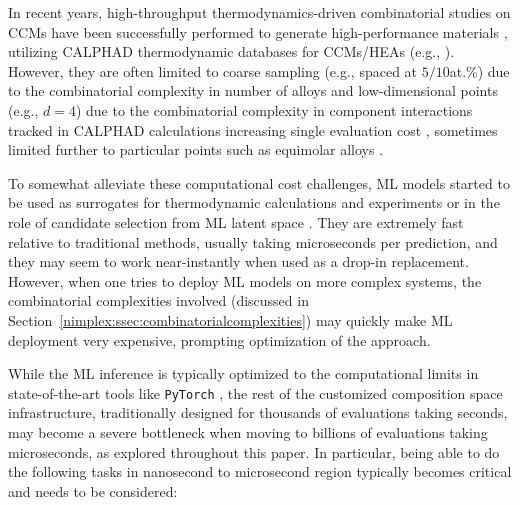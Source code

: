 In recent years, high-throughput thermodynamics-driven combinatorial studies on CCMs have been successfully performed to generate high-performance materials \cite{Elder2023ComputationalValidation, Elder2023ComputationalDown-selection}, utilizing  CALPHAD thermodynamic databases for CCMs/HEAs (e.g., \cite{Ostrowska2020ThermodynamicW, Ostrowska2022ThermodynamicExperiments, GambaroCombinedAlloys}). However, they are often limited to coarse sampling (e.g., spaced at $5/10$at.\%) due to the combinatorial complexity in number of alloys and low-dimensional points (e.g., $d=4$) due to the combinatorial complexity in component interactions tracked in CALPHAD calculations increasing single evaluation cost \cite{Elder2023ComputationalValidation, Elder2023ComputationalDown-selection}, sometimes limited further to particular points such as equimolar alloys \cite{Yan2021AcceleratedLearning}.


To somewhat alleviate these computational cost challenges, ML models started to be used as surrogates for thermodynamic calculations and experiments \cite{Debnath2023ComparingAlloys, Tandoc2023MiningAlloys} or in the role of candidate selection from ML latent space \cite{Rao2022MachineDiscovery}. They are extremely fast relative to traditional methods, usually taking microseconds per prediction, and they may seem to work near-instantly when used as a drop-in replacement. However, when one tries to deploy ML models on more complex systems, the combinatorial complexities involved (discussed in Section~\ref{nimplex:ssec:combinatorialcomplexities}) may quickly make ML deployment very expensive, prompting optimization of the approach. 

While the ML inference is typically optimized to the computational limits in state-of-the-art tools like \texttt{PyTorch} \cite{Paszke2019PyTorch:Library}, the rest of the customized composition space infrastructure, traditionally designed for thousands of evaluations taking seconds, may become a severe bottleneck when moving to billions of evaluations taking microseconds, as explored throughout this paper. In particular, being able to do the following tasks in nanosecond to microsecond region typically becomes critical and needs to be considered:

